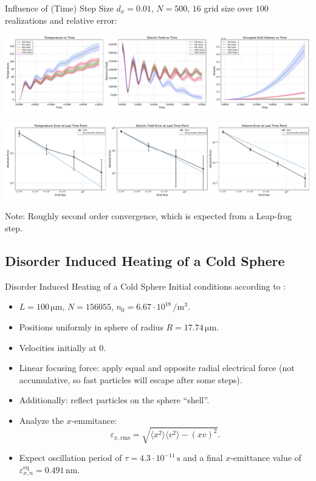 \begin{frame}{Influence of (Time) Step Size}
    $d_x = 0.01$, $N = 500$, $16$ grid size over $100$ realizations and relative error:
    \begin{minipage}{\textwidth}
        \centering
        \includegraphics[width=\textwidth]{ressources/test2/T_E_V_comparison_timestepsize.pdf}
    \end{minipage}
    \begin{minipage}{\textwidth}
        \centering
        \includegraphics[width=\textwidth]{ressources/test2/T_E_V_comparison_timestepsize_errors.pdf}
    \end{minipage}
    Note: Roughly second order convergence, which is expected from a Leap-frog step.
\end{frame}


\subsection{Disorder Induced Heating of a Cold Sphere}

\begin{frame}{Disorder Induced Heating of a Cold Sphere}
    Initial conditions according to \cite[595]{Mitchell2015}:
    \begin{itemize}
        \item $L = 100\,\si{\micro\metre}$, $N=156055$, $n_0 = 6.67\cdot 10^{18}\,\si{\per\metre\cubed}$.
        \item Positions uniformly in sphere of radius $R = 17.74\,\si{\micro\metre}$.
        \item Velocities initially at $0$.
        \item Linear focusing force: apply equal and opposite radial electrical force (not accumulative, so fast particles will escape after some steps). 
        \item Additionally: reflect particles on the sphere ``shell''.
        \item Analyze the $x$-emmitance:
        $$
        \varepsilon_{x, \mathrm{rms}} = \sqrt{\langle x^2 \rangle \langle v^2 \rangle - (xv)^2}.
        $$
        \item Expect oscillation period of $\tau = 4.3 \cdot 10^{-11}\,\si{\second}$ and a final $x$-emittance value of $\varepsilon_{x,n}^\mathrm{eq} = 0.491 \,\si{\nano\metre}$.    
    \end{itemize}
\end{frame}

